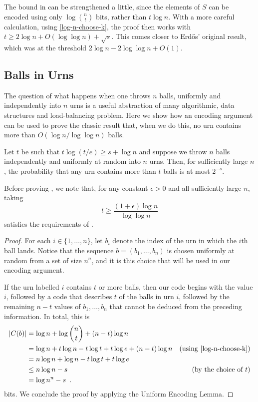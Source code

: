 \documentclass{patmorin}
\begin{document}
\begin{rem}
  The bound in  can be strengthened a little,
  since the elements of $S$ can be encoded using only
  $\log\binom{n}{t}$ bits, rather than $t\log n$.  With a more careful
  calculation, using \eqref{log-n-choose-k}, the proof then works with
  $t \ge 2\log n +O(\log\log n) + \sqrt{s}$. This comes closer to
  Erdős' original result, which was at the threshold $2\log n -
  2\log\log n + O(1)$.
\end{rem}



\subsection{Balls in Urns}

The question of what happens when one throws $n$ balls, uniformly and
independently into $n$ urns is a useful abstraction of many
algorithmic, data structures and load-balancing problem.  Here we show
how an encoding argument can be used to prove the classic result that,
when we do this, no urn contains more than $O(\log n/\log\log n)$
balls.

\begin{thm}
  Let $t$ be such that $t\log(t/e) \ge s+\log n$ and suppose we throw
  $n$ balls independently and uniformly at random into $n$ urns. Then,
  for sufficiently large $n$, the probability that any urn contains more 
  than $t$ balls is at most $2^{-s}$.
\end{thm}

Before proving , we note that, for any constant $\epsilon
>0$ and all sufficiently large $n$, taking
\[
t \ge \frac{(1+\epsilon)\log n}{\log\log n}
\] 
satisfies the requirements of .

\begin{proof}
  For each $i\in\{1,\ldots,n\}$, let $b_i$ denote the index of the urn
  in which the $i$th ball lands. Notice that the sequence
  $b = (b_1,\ldots,b_n)$ is chosen uniformly at random from a set of
  size $n^n$, and it is this choice that will be used in our encoding
  argument.

  If the urn labelled $i$ contains $t$ or more balls, then our code
  begins with the value $i$, followed by a code that describes $t$ of
  the balls in urn $i$, followed by the remaining $n-t$ values of
  $b_1,\ldots,b_n$ that cannot be deduced from the preceding
  information.  In total, this is
  \begin{align*}
    |C(b)| &= \log n + \log\binom{n}{t} + (n-t)\log n \\
           &= \log n + t\log n - t\log t + t\log e + (n-t)\log n
           & \text{(using \eqref{log-n-choose-k})} \\
           & = n \log n + \log n - t\log t + t\log e \\
           & \le  n\log n - s &\text{(by the choice of $t$)} \\
           & = \log n^n - s \enspace .
  \end{align*}
  bits. We conclude the proof by applying the Uniform Encoding Lemma.
\end{proof}
\end{document}
